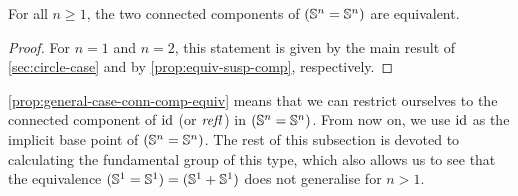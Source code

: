 \documentclass[english,a4]{article}
\begin{document}
\begin{proposition} \label{prop:general-case-conn-comp-equiv}
    For all $n \geq 1$, the two connected components of $({\mathbb S^{n}} = {\mathbb S^{n}})$ are equivalent.
\end{proposition}
\begin{proof}
    For $n=1$ and $n=2$, this statement is given by the main result of \cref{sec:circle-case} and by \cref{prop:equiv-susp-comp}, respectively.
\end{proof}

\cref{prop:general-case-conn-comp-equiv} means that we can restrict ourselves to the connected component of $\mathord{\mathrm{id}}$ (or $\mathop{{\mathit{refl}}_{}}$) in $({\mathbb S^{n}} = {\mathbb S^{n}})$. From now on, we use $\mathord{\mathrm{id}}$ as the implicit base point of $({\mathbb S^{n}} = {\mathbb S^{n}})$.
The rest of this subsection is devoted to calculating the fundamental group of this type, which also allows us to see that the equivalence $({\mathbb S^{1}} = {\mathbb S^{1}}) = ({\mathbb S^{1}} + {\mathbb S^{1}})$ does not generalise for $n > 1$.

\end{document}
